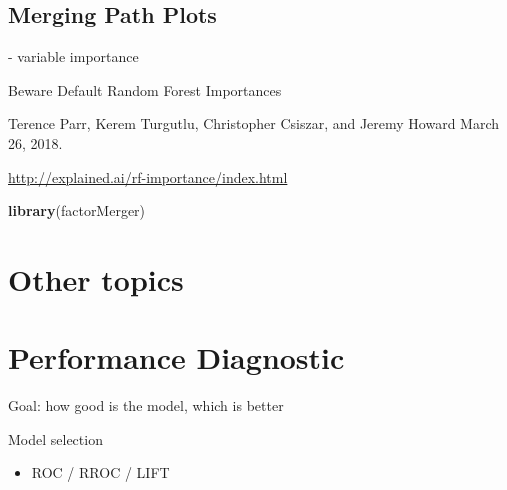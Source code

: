 \documentclass[]{krantz}
\newenvironment{Shaded}{\begin{snugshade}}{\end{snugshade}}
\newcommand{\KeywordTok}[1]{\textcolor[rgb]{0.13,0.29,0.53}{\textbf{#1}}}
\newcommand{\NormalTok}[1]{#1}
\providecommand{\tightlist}{%
  \setlength{\itemsep}{0pt}\setlength{\parskip}{0pt}}
\theoremstyle{definition}
\theoremstyle{definition}
\theoremstyle{definition}
\theoremstyle{remark}
\begin{document}
\hypertarget{merging-path-plots}{%
\subsection{Merging Path Plots}\label{merging-path-plots}}

\citep{demsar2018}

\citep{RJ2017016} \citep{MAGIX}

\citep{R-factorMerger}

\citep{Strobl2007} \citep{Strobl2008} - variable importance

\citep{2018arXiv180101489F}

Beware Default Random Forest Importances

Terence Parr, Kerem Turgutlu, Christopher Csiszar, and Jeremy Howard
March 26, 2018.

\url{http://explained.ai/rf-importance/index.html}

\citep{R-factorMerger}

\begin{Shaded}
\begin{Highlighting}[]
\KeywordTok{library}\NormalTok{(factorMerger)}
\end{Highlighting}
\end{Shaded}

\hypertarget{other-topics}{%
\section{Other topics}\label{other-topics}}

\citep{R-randomForestExplainer} \citep{R-ICEbox} \citep{R-ALEPlot}

\citep{R-modelDown}

\hypertarget{modelComparisons}{%
\section{Performance Diagnostic}\label{modelComparisons}}

Goal: how good is the model, which is better

Model selection

\begin{itemize}
\tightlist
\item
  ROC / RROC / LIFT
\end{itemize}
\end{document}
